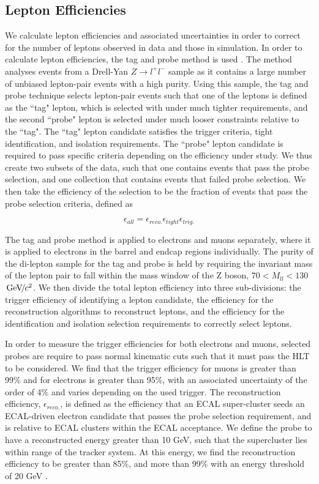 \subsection{Lepton Efficiencies} \label{subsec-LeptonEfficiencies}

We calculate lepton efficiencies and associated uncertainties in order to correct for the number of leptons observed in data and those in simulation. In order to calculate lepton efficiencies, the tag and probe method is used \cite{tangandprobe}. The method analyses events from a Drell-Yan $Z \to l^+l^-$ sample as it contains a large number of unbiased lepton-pair events with a high purity. Using this sample, the tag and probe technique selects lepton-pair events such that one of the leptons is defined as the ``tag" lepton, which is selected with under much tighter requirements, and the second ``probe" lepton is selected under much looser constraints relative to the ``tag".  The ``tag" lepton candidate satisfies the trigger criteria, tight identification, and isolation requirements. The ``probe" lepton candidate is required to pass specific criteria depending on the efficiency under study. We thus create two subsets of the data, such that one contains events that pass the probe selection, and one collection that contains events that failed probe selection. We then take the efficiency of the selection to be the fraction of events that pass the probe selection criteria, defined as 

\begin{equation}
\epsilon_{all} = \epsilon_{reco.}\epsilon_{tight}\epsilon_{trig.}
\end{equation}

The tag and probe method is applied to electrons and muons separately, where it is applied to electrons in the barrel and endcap regions individually. The purity of the di-lepton sample for the tag and probe is held by requiring the invariant mass of the lepton pair to fall within the mass window of the Z boson, $70 < M_{ll} < 130$ ${\,\text{Ge\hspace{-.08em}V\hspace{-0.16em}/\hspace{-0.08em}}c^\text{2}}$. We then divide the total lepton efficiency into three sub-divisions: the trigger efficiency of identifying a lepton candidate, the efficiency for the reconstruction algorithms to reconstruct leptons, and the efficiency for the identification and isolation selection requirements to correctly select leptons. 

In order to measure the trigger efficiencies for both electrons and muons, selected probes are require to pass normal kinematic cuts such that it must pass the HLT to be considered. We find that the trigger efficiency for muons is greater than 99\% and for electrons is greater than 95\%, with an associated uncertainty of the order of 4\% and varies depending on the used trigger. The reconstruction efficiency, $\epsilon_{reco.}$, is defined as the efficiency that an ECAL super-cluster seeds an ECAL-driven electron candidate that passes the probe selection requirement, and is relative to ECAL clusters within the ECAL acceptance. We define the probe to have a reconstructed energy greater than 10 GeV, such that the supercluster lies within range of the tracker system. At this energy, we find the reconstruction efficiency to be greater than 85\%, and more than 99\% with an energy threshold of 20 GeV \cite{Khachatryan:2015hwa}.

